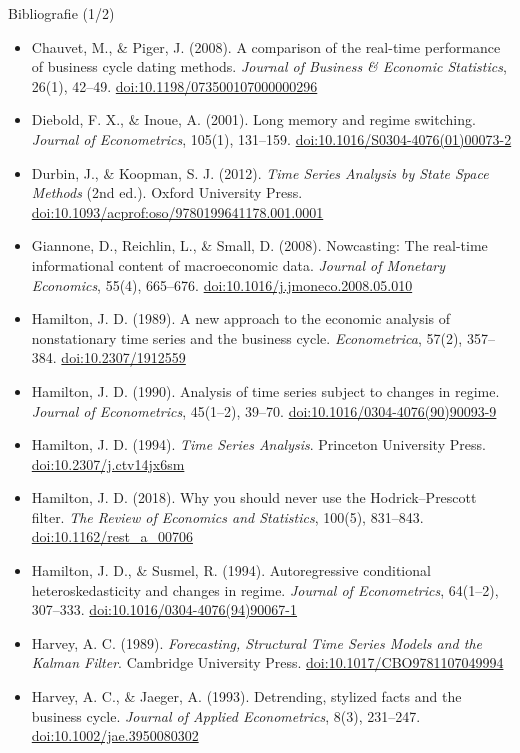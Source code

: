 \begin{frame}{Bibliografie (1/2)}
\itemsize{\scriptsize}
\begin{itemize}
    \item Chauvet, M., \& Piger, J. (2008). A comparison of the real-time performance of business cycle dating methods. \textit{Journal of Business \& Economic Statistics}, 26(1), 42--49. \href{https://doi.org/10.1198/073500107000000296}{doi:10.1198/073500107000000296}
    \item Diebold, F. X., \& Inoue, A. (2001). Long memory and regime switching. \textit{Journal of Econometrics}, 105(1), 131--159. \href{https://doi.org/10.1016/S0304-4076(01)00073-2}{doi:10.1016/S0304-4076(01)00073-2}
    \item Durbin, J., \& Koopman, S. J. (2012). \textit{Time Series Analysis by State Space Methods} (2nd ed.). Oxford University Press. \href{https://doi.org/10.1093/acprof:oso/9780199641178.001.0001}{doi:10.1093/acprof:oso/9780199641178.001.0001}
    \item Giannone, D., Reichlin, L., \& Small, D. (2008). Nowcasting: The real-time informational content of macroeconomic data. \textit{Journal of Monetary Economics}, 55(4), 665--676. \href{https://doi.org/10.1016/j.jmoneco.2008.05.010}{doi:10.1016/j.jmoneco.2008.05.010}
    \item Hamilton, J. D. (1989). A new approach to the economic analysis of nonstationary time series and the business cycle. \textit{Econometrica}, 57(2), 357--384. \href{https://doi.org/10.2307/1912559}{doi:10.2307/1912559}
    \item Hamilton, J. D. (1990). Analysis of time series subject to changes in regime. \textit{Journal of Econometrics}, 45(1--2), 39--70. \href{https://doi.org/10.1016/0304-4076(90)90093-9}{doi:10.1016/0304-4076(90)90093-9}
    \item Hamilton, J. D. (1994). \textit{Time Series Analysis}. Princeton University Press. \href{https://doi.org/10.2307/j.ctv14jx6sm}{doi:10.2307/j.ctv14jx6sm}
    \item Hamilton, J. D. (2018). Why you should never use the Hodrick--Prescott filter. \textit{The Review of Economics and Statistics}, 100(5), 831--843. \href{https://doi.org/10.1162/rest\_a\_00706}{doi:10.1162/rest\_a\_00706}
    \item Hamilton, J. D., \& Susmel, R. (1994). Autoregressive conditional heteroskedasticity and changes in regime. \textit{Journal of Econometrics}, 64(1--2), 307--333. \href{https://doi.org/10.1016/0304-4076(94)90067-1}{doi:10.1016/0304-4076(94)90067-1}
    \item Harvey, A. C. (1989). \textit{Forecasting, Structural Time Series Models and the Kalman Filter}. Cambridge University Press. \href{https://doi.org/10.1017/CBO9781107049994}{doi:10.1017/CBO9781107049994}
    \item Harvey, A. C., \& Jaeger, A. (1993). Detrending, stylized facts and the business cycle. \textit{Journal of Applied Econometrics}, 8(3), 231--247. \href{https://doi.org/10.1002/jae.3950080302}{doi:10.1002/jae.3950080302}
\end{itemize}
\end{frame}

